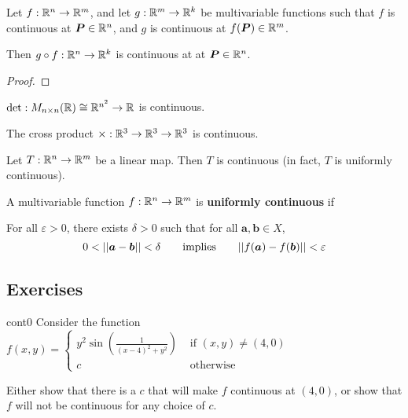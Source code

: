     \begin{theorem}
    Let $f : \mathbb{R}^n \to \mathbb{R}^m$, and let $g: \mathbb{R}^m \to \mathbb{R}^k$ be multivariable functions such that $f$ is continuous at $\bm{P} \in \mathbb{R}^n$, and $g$ is continuous at $f(\bm{P}) \in \mathbb{R}^m$.
    
    \vspace{1em}
    Then $g \circ f : \mathbb{R}^n \to \mathbb{R}^k$ is continuous at at $\bm{P} \in \mathbb{R}^n$.
    \end{theorem}
    
    \begin{proof}
    \end{proof}
    
    \begin{theorem}
    $\det : M_{n \times n}(\mathbb{R}) \cong \mathbb{R}^{n^2} \to \mathbb{R}$ is continuous.
    \end{theorem}
    
    \begin{corollary}
    The cross product $\times : \mathbb{R}^3 \to \mathbb{R}^3 \to \mathbb{R}^3$ is continuous.
    \end{corollary}
    
    
    
    \begin{theorem}
    Let $T: \mathbb{R}^n \to \mathbb{R}^m$ be a linear map.  Then $T$ is continuous (in fact, $T$ is uniformly continuous).
    \end{theorem}
    
    \begin{definition}
    A multivariable function $f : \mathbb{R}^n \to \mathbb{R}^m$ is \textbf{uniformly continuous} if 
    
    \vspace{1em}
    For all $\varepsilon>0$, there exists $\delta > 0$ such that for all $\bm{a}, \bm{b} \in X$, $$0 < ||\bm{a} - \bm{b} || < \delta \qquad \textnormal{implies} \qquad ||f(\bm{a}) - f(\bm{b}) || < \varepsilon$$
    
    \end{definition}
    
    
    
\subsection{Exercises}

\begin{problem}{cont0}
Consider the function  $f(x,y) = \left\{
		\begin{array}{ll}
			y^2\sin(\frac{1}{(x-4)^2 + y^2}) & \text{ if } (x,y) \neq (4,0) \\
			c & \text{ otherwise } 
		\end{array}
		\right.$
		
		Either show that there is a $c$ that will make $f$ continuous at $(4,0)$, or show that $f$ will not be continuous for any choice of $c$.
\end{problem}

